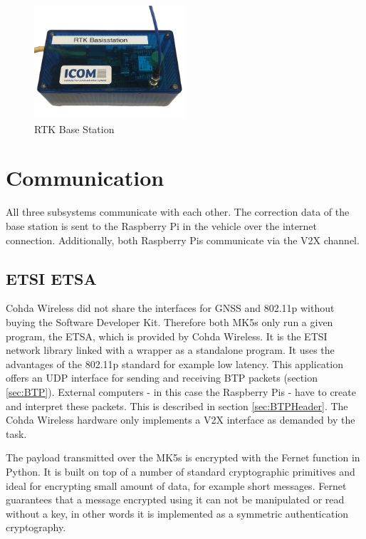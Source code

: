 \begin{figure}[htb]
	\centering
	\includegraphics[width=0.5\textwidth]{images/Base_station}
	\caption{RTK Base Station}
	\label{fig:BaseStation}
\end{figure}
\newpage
\section{Communication}\label{sec:BTP_over_UDP}

All three subsystems communicate with each other. The correction data of the base station is sent to the Raspberry Pi in the vehicle over the internet connection. Additionally, both Raspberry Pis communicate via the V2X channel. 

\subsection{ETSI ETSA}

Cohda Wireless did not share the interfaces for GNSS and 802.11p without buying the Software Developer Kit. Therefore both MK5s only run a given program, the ETSA, which is provided by Cohda Wireless. It is the ETSI network library linked with a wrapper as a standalone program. It uses the advantages of the 802.11p standard for example low latency. This application offers an UDP interface for sending and receiving BTP packets (section \ref{sec:BTP}). External computers - in this case the Raspberry Pis - have to create and interpret these packets. This is described in section \ref{sec:BTPHeader}. The Cohda Wireless hardware only implements a V2X interface as demanded by the task. \cite{CohdaWirelessETSA}

The payload transmitted over the MK5s is encrypted with the Fernet function in Python. It is built on top of a number of standard cryptographic primitives and ideal for encrypting small amount of data, for example short messages. Fernet guarantees that a message encrypted using it can not be manipulated or read without a key, in other words it is implemented as a symmetric authentication cryptography. \cite{Fernet}

